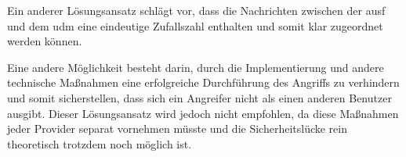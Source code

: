 Ein anderer Lösungsansatz schlägt vor, dass die Nachrichten zwischen der \gls{ausf} und dem \gls{udm} eine eindeutige Zufallszahl enthalten und somit klar zugeordnet werden können.

Eine andere Möglichkeit besteht darin, durch die Implementierung und andere technische Maßnahmen eine erfolgreiche Durchführung des Angriffs zu verhindern und somit sicherstellen, dass sich ein Angreifer nicht als einen anderen Benutzer ausgibt.
Dieser Lösungsansatz wird jedoch nicht empfohlen, da diese Maßnahmen jeder Provider separat vornehmen müsste und die Sicherheitslücke rein theoretisch trotzdem noch möglich ist.





